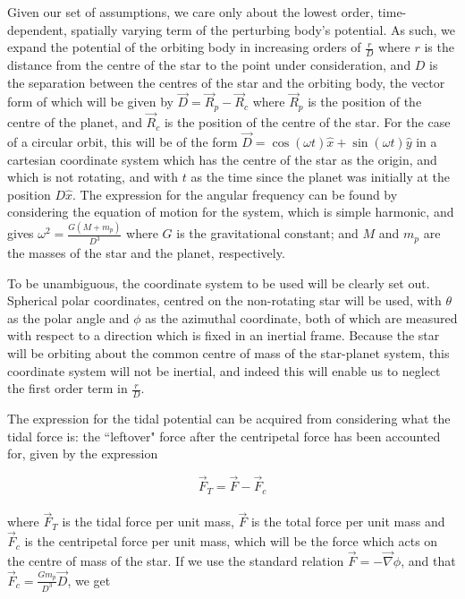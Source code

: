 \documentclass[11pt]{amsart}
\begin{document}
Given our set of assumptions, we care only about the lowest order, time-dependent, spatially varying term of the
perturbing body's potential.  As such, we expand the potential of the orbiting body in increasing orders of $\frac{r}{D}$
where $r$ is the distance from the centre of the star to the point under consideration, and $D$ is the separation
between the centres of the star and the orbiting body, the vector form of which will be given by $\vec{D} = \vec{R}_{p} - \vec{R}_{c}$
where $\vec{R}_{p}$ is the position of the centre of the planet, and $\vec{R}_{c}$ is the position of the centre of the star.
For the case of a circular orbit, this will be of the form $\vec{D} = \cos (\omega t) \hat{x} + \sin (\omega t) \hat{y}$
in a cartesian coordinate system which has the centre of the star as the origin, and which is not rotating, and with $t$ as the time
since the planet was initially at the position $D \hat{x}$.  The expression
for the angular frequency can be found by considering the equation of motion for the system, which is simple harmonic, and gives
$\omega^{2} = \frac{G (M + m_{p})}{D^{3}}$ where $G$ is the gravitational constant; and $M$ and $m_{p}$ are the masses of the star and
the planet, respectively.

To be unambiguous, the coordinate system to be used will be clearly set out.  Spherical polar coordinates, centred on the
non-rotating star will be used, with $\theta$ as the polar angle and $\phi$ as the azimuthal coordinate, both of which are
measured with respect to a direction which is fixed in an inertial frame.  Because the star will be orbiting about the
common centre of mass of the star-planet system, this coordinate system will not be inertial, and indeed this will enable us
to neglect the first order term in $\frac{r}{D}$.

The expression for the tidal potential can be acquired from considering what the tidal force is:
the ``leftover" force after the centripetal force has been accounted for, given by the expression

\begin{equation}
\vec{F}_{T} = \vec{F} - \vec{F}_{c}
\end{equation}
\\
where $\vec{F}_{T}$ is the tidal force per unit mass, $\vec{F}$ is the total force per unit mass and $\vec{F}_{c}$ is the centripetal force per unit mass,
which will be the force which acts on the centre of mass of the star.  If we use the standard relation 
$\vec{F} = -  \vec{\nabla}\phi$, and that $\vec{F}_{c} = \frac{G m_{p}}{D^3} \vec{D}$, we get
\end{document}
